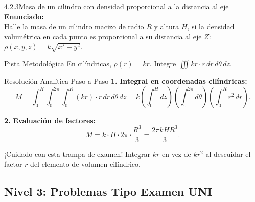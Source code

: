 \documentclass[11pt,a4paper]{article}
\begin{document}
\begin{nivelbox}{4.2.3}{Masa de un cilindro con densidad proporcional a la distancia al eje}
\textbf{Enunciado:}\\
Halle la masa de un cilindro macizo de radio $R$ y altura $H$, si la densidad volumétrica en cada punto es proporcional a su distancia al eje $Z$: $\rho(x,y,z) = k \sqrt{x^2+y^2}$.

\begin{observacionbox}{Pista Metodológica}
En cilíndricas, $\rho(r) = k r$. Integre $\iiint k r \cdot r \, dr \, d\theta \, dz$.
\end{observacionbox}

\begin{ejerciciobox}{Resolución Analítica Paso a Paso}
\smallskip\noindent\textbf{1.} \textbf{Integral en coordenadas cilíndricas:}
\[M = \int_0^H \int_0^{2\pi} \int_0^R (k r) \cdot r \, dr \, d\theta \, dz = k \left( \int_0^H dz \right) \left( \int_0^{2\pi} d\theta \right) \left( \int_0^R r^2 \, dr \right).\]

\smallskip\noindent\textbf{2.} \textbf{Evaluación de factores:}
\[M = k \cdot H \cdot 2\pi \cdot \frac{R^3}{3} = \frac{2\pi k H R^3}{3}.\]
\end{ejerciciobox}

\begin{errorbox}{¡Cuidado con esta trampa de examen!}
Integrar $k r$ en vez de $k r^2$ al descuidar el factor $r$ del elemento de volumen cilíndrico.
\end{errorbox}
\end{nivelbox}
\bigskip

\subsection{Nivel 3: Problemas Tipo Examen UNI}
\end{document}
